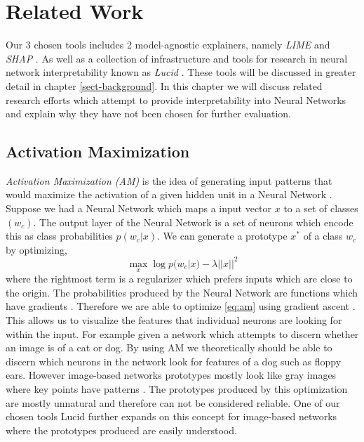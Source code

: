 \chapter{Related Work} \label{sect-related}
Our 3 chosen tools includes 2 model-agnostic explainers, namely \emph{LIME} \cite{lime} and \emph{SHAP} \cite{NIPS2017_7062}. As well as a collection of infrastructure and tools for research in neural network interpretability known as \emph{Lucid} \cite{Https://github.com/tensorflow/lucid}. These tools will be discussed in greater detail in chapter \ref{sect-background}. In this chapter we will discuss related research efforts which attempt to provide interpretability into Neural Networks and explain why they have not been chosen for further evaluation.

\section{Activation Maximization}
\emph{Activation Maximization (AM)} is the idea of generating input patterns that would maximize the activation of a given hidden unit in a Neural Network \cite{simonyan2014deep}\cite{10.1162/neco.2006.18.8.1868}\cite{articlec}. Suppose we had a Neural Network which maps a input vector $x$ to a set of classes $(w_{c})$. The output layer of the Neural Network is a set of neurons which encode this as class probabilities $p(w_{c}|x)$. We can generate a prototype $x^{*}$ of a class $w_{c}$ by optimizing,
\begin{equation}
    \max_{x} \log p(w_{c}|x) - \lambda||x||^{2}
    \label{eq:am}
\end{equation}
where the rightmost term is a regularizer which prefers inputs which are close to the origin. The probabilities produced by the Neural Network are functions which have gradients \cite{10.5555/525960}. Therefore we are able to optimize \ref{eq:am} using gradient ascent \cite{DBLP:journals/corr/Ruder16}. This allows us to visualize the features that individual neurons are looking for within the input. For example given a network which attempts to discern whether an image is of a cat or dog. By using AM we theoretically should be able to discern which neurons in the network look for features of a dog such as floppy ears. However image-based networks prototypes mostly look like gray images where key points have patterns \cite{simonyan2014deep}. The prototypes produced by this optimization are mostly unnatural and therefore can not be considered reliable. One of our chosen tools Lucid further expands on this concept for image-based networks where the prototypes produced are easily understood. 

